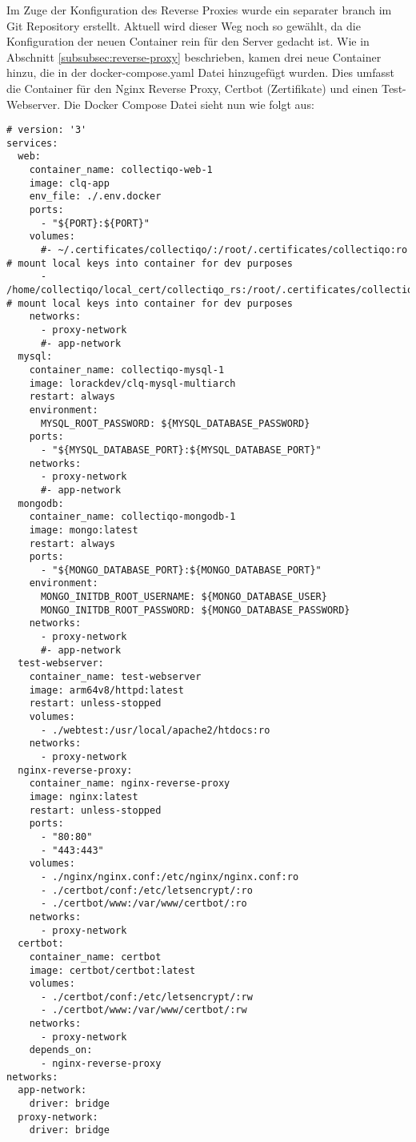 Im Zuge der Konfiguration des Reverse Proxies wurde ein separater branch im Git Repository erstellt.
Aktuell wird dieser Weg noch so gewählt, da die Konfiguration der neuen Container rein für den Server gedacht ist.
Wie in Abschnitt \ref{subsubsec:reverse-proxy} beschrieben, kamen drei neue Container hinzu, die in der docker-compose.yaml Datei hinzugefügt wurden.
Dies umfasst die Container für den Nginx Reverse Proxy, Certbot (Zertifikate) und einen Test-Webserver.
Die Docker Compose Datei sieht nun wie folgt aus:
\vspace{1em}
\begin{lstlisting}[label={lst:lst-docker-compose-yaml}]
# version: '3'
services:
  web:
    container_name: collectiqo-web-1
    image: clq-app
    env_file: ./.env.docker
    ports:
      - "${PORT}:${PORT}"
    volumes:
      #- ~/.certificates/collectiqo/:/root/.certificates/collectiqo:ro # mount local keys into container for dev purposes
      - /home/collectiqo/local_cert/collectiqo_rs:/root/.certificates/collectiqo:ro # mount local keys into container for dev purposes
    networks:
      - proxy-network
      #- app-network
  mysql:
    container_name: collectiqo-mysql-1
    image: lorackdev/clq-mysql-multiarch
    restart: always
    environment:
      MYSQL_ROOT_PASSWORD: ${MYSQL_DATABASE_PASSWORD}
    ports:
      - "${MYSQL_DATABASE_PORT}:${MYSQL_DATABASE_PORT}"
    networks:
      - proxy-network
      #- app-network
  mongodb:
    container_name: collectiqo-mongodb-1
    image: mongo:latest
    restart: always
    ports:
      - "${MONGO_DATABASE_PORT}:${MONGO_DATABASE_PORT}"
    environment:
      MONGO_INITDB_ROOT_USERNAME: ${MONGO_DATABASE_USER}
      MONGO_INITDB_ROOT_PASSWORD: ${MONGO_DATABASE_PASSWORD}
    networks:
      - proxy-network
      #- app-network
  test-webserver:
    container_name: test-webserver
    image: arm64v8/httpd:latest
    restart: unless-stopped
    volumes:
      - ./webtest:/usr/local/apache2/htdocs:ro
    networks:
      - proxy-network
  nginx-reverse-proxy:
    container_name: nginx-reverse-proxy
    image: nginx:latest
    restart: unless-stopped
    ports:
      - "80:80"
      - "443:443"
    volumes:
      - ./nginx/nginx.conf:/etc/nginx/nginx.conf:ro
      - ./certbot/conf:/etc/letsencrypt/:ro
      - ./certbot/www:/var/www/certbot/:ro
    networks:
      - proxy-network
  certbot:
    container_name: certbot
    image: certbot/certbot:latest
    volumes:
      - ./certbot/conf:/etc/letsencrypt/:rw
      - ./certbot/www:/var/www/certbot/:rw
    networks:
      - proxy-network
    depends_on:
      - nginx-reverse-proxy
networks:
  app-network:
    driver: bridge
  proxy-network:
    driver: bridge
\end{lstlisting}
\vspace{1em}

